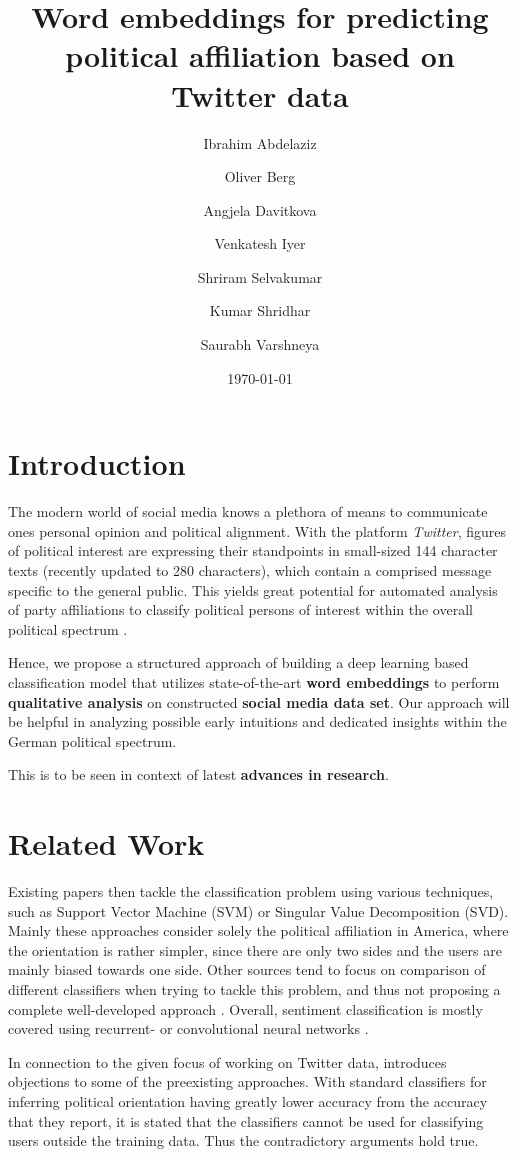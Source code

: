 \documentclass[10pt, oneside]{article}
\title{Word embeddings for predicting political affiliation based on Twitter data}
\author[]{Ibrahim Abdelaziz}
\author[]{Oliver Berg}
\author[]{Angjela Davitkova}
\author[]{Venkatesh Iyer}
\author[]{Shriram Selvakumar}
\author[]{Kumar Shridhar}
\author[]{Saurabh Varshneya}
\affil[1]{Technische Universität Kaiserslautern}
\date{\today}
\begin{document}
\maketitle
\begin{multicols}{2}


\section{Introduction}

The modern world of social media knows a plethora of means to communicate ones personal opinion and political alignment. With the platform \textit{Twitter}, figures of political interest are expressing their standpoints in small-sized 144 character texts (recently updated to 280 characters), which contain a comprised message specific to the general public. This yields great potential for automated analysis of party affiliations to classify political persons of interest within the overall political spectrum \cite{Biessmann2017}.

Hence, we propose a structured approach of building a deep learning based classification model that utilizes state-of-the-art \textbf{word embeddings} \cite{Pelevinala2016} to perform \textbf{qualitative analysis} on constructed \textbf{social media data set}. Our approach will be helpful in analyzing possible early intuitions and dedicated insights within the German political spectrum.

This is to be seen in context of latest \textbf{advances in research}.


\section{Related Work}

Existing papers \cite{Misra2016} then tackle the classification problem using various techniques, such as Support Vector Machine (SVM) or Singular Value Decomposition (SVD). Mainly these approaches consider solely the political affiliation in America, where the orientation is rather simpler, since there are only two sides and the users are mainly biased towards one side. 
Other sources tend to focus on comparison of different classifiers when trying to tackle this problem, and thus not proposing a complete well-developed approach \cite{Bhanda2009}.
Overall, sentiment classification is mostly covered using recurrent- or convolutional neural networks \cite{Kim2014}.

In connection to the given focus of working on Twitter data, \cite{Cohen2013} introduces objections to some of the preexisting approaches. With standard classifiers for inferring political orientation having greatly lower accuracy from the accuracy that they report, it is stated that the classifiers cannot be used for classifying users outside the training data. Thus the contradictory arguments hold true.



\end{multicols}
\end{document}
